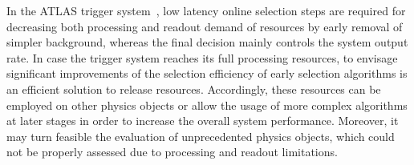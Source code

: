 


In the ATLAS trigger system~\cite{TRIG-2016-01}, low latency online selection
steps are required for decreasing both processing and readout demand of
resources by early removal of simpler background, whereas the final decision
mainly controls the system output rate. In case the trigger system reaches its
full processing resources, to envisage significant improvements of the selection
efficiency of early selection algorithms is an efficient solution to release
resources. Accordingly, these resources can be employed on other physics
objects or allow the usage of more complex algorithms at later stages in order
to increase the overall system performance. Moreover, it may turn feasible the
evaluation of unprecedented physics objects, which could not be properly
assessed due to processing and readout limitations.


